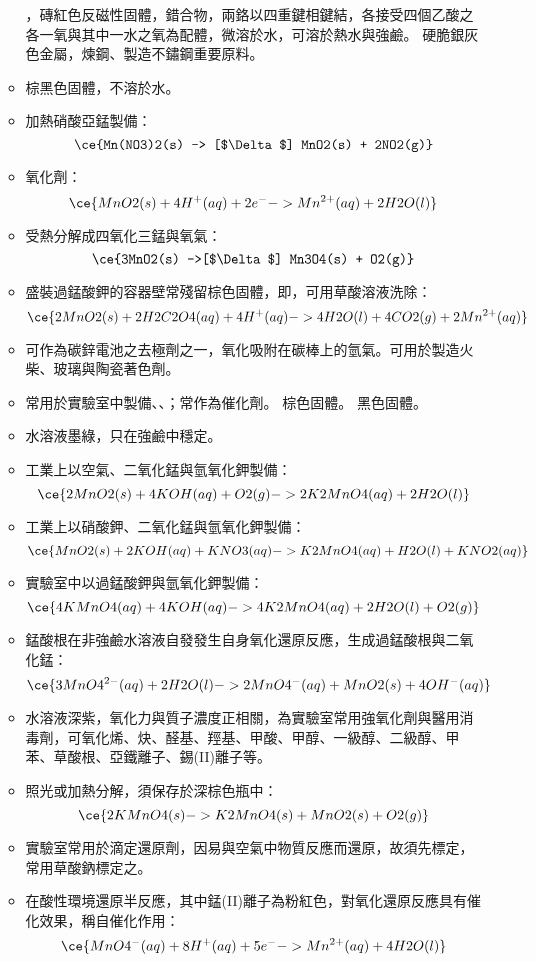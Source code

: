 \documentclass[a4paper,12pt]{report}
\begin{document}
\begin{itemize}
\begin{itemize}
\ce{[Cr2(CH3COO)4(H2O)2]}，磚紅色反磁性固體，錯合物，兩鉻以四重鍵相鍵結，各接受四個乙酸之各一氧與其中一水之氧為配體，微溶於水，可溶於熱水與強鹼。
硬脆銀灰色金屬，煉鋼、製造不鏽鋼重要原料。
\bit
\item 棕黑色固體，不溶於水。
\item 加熱硝酸亞錳製備：
\[\ce{Mn(NO3)2(s) -> [$\Delta$] MnO2(s) + 2NO2(g)}\]
\item 氧化劑：
\[\ce{MnO2(s) + 4H^+(aq) + 2e^- -> Mn^{2+}(aq) + 2H2O(l)}\]
\item 受熱分解成四氧化三錳與氧氣：
\[\ce{3MnO2(s) ->[$\Delta$] Mn3O4(s) + O2(g)}\]
\item 盛裝過錳酸鉀的容器壁常殘留棕色固體，即，可用草酸溶液洗除：
\[\ce{2MnO2(s) + 2H2C2O4(aq) + 4H^+(aq) -> 4H2O(l) + 4CO2(g) + 2Mn^{2+}(aq)}\]
\item 可作為碳鋅電池之去極劑之一，氧化吸附在碳棒上的氫氣。可用於製造火柴、玻璃與陶瓷著色劑。
\item 常用於實驗室中製備、、；常作為催化劑。
\eit
{}
棕色固體。
黑色固體。
\bit
\item 水溶液墨綠，只在強鹼中穩定。
\item 工業上以空氣、二氧化錳與氫氧化鉀製備：
\[\ce{2MnO2(s) + 4KOH(aq) + O2(g) -> 2K2MnO4(aq) + 2H2O(l)}\]
\item 工業上以硝酸鉀、二氧化錳與氫氧化鉀製備：
\[\ce{MnO2(s) + 2KOH(aq) + KNO3(aq) -> K2MnO4(aq) + H2O(l) + KNO2(aq)}\]
\item 實驗室中以過錳酸鉀與氫氧化鉀製備：
\[\ce{4KMnO4(aq) + 4KOH(aq) -> 4K2MnO4(aq) + 2H2O(l) + O2(g)}\]
\item 錳酸根在非強鹼水溶液自發發生自身氧化還原反應，生成過錳酸根與二氧化錳：
\[\ce{3MnO4^{2-}(aq) + 2H2O(l) -> 2MnO4^-(aq) + MnO2(s) + 4OH^-(aq)}\]
\eit
{}
\bit
\item 水溶液深紫，氧化力與質子濃度正相關，為實驗室常用強氧化劑與醫用消毒劑，可氧化烯、炔、醛基、羥基、甲酸、甲醇、一級醇、二級醇、甲苯、草酸根、亞鐵離子、錫(II)離子等。
\item 照光或加熱分解，須保存於深棕色瓶中：
\[\ce{2KMnO4(s) -> K2MnO4(s) + MnO2(s) + O2(g)}\]
\item 實驗室常用於滴定還原劑，因易與空氣中物質反應而還原，故須先標定，常用草酸鈉標定之。
\item 在酸性環境還原半反應，其中錳(II)離子為粉紅色，對氧化還原反應具有催化效果，稱自催化作用：
\[\ce{MnO4^-(aq) + 8H^+(aq) + 5e^- -> Mn^{2+}(aq) + 4H2O(l)}\]

\end{itemize}
\end{itemize}
\end{document}
